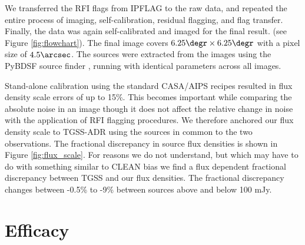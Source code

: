 \documentclass[twocolumn]{aastex61}
\begin{document}
{We transferred the RFI flags from IPFLAG to the raw data, and repeated
the entire process of imaging, self-calibration, residual flagging, and flag
transfer. Finally, the data was again self-calibrated and imaged for the final
result.  (see Figure \ref{fig:flowchart}). The final image covers $6.25\degr
\times 6.25 \degr$ with a pixel size of $4.5\arcsec$. The sources were extracted
from the images  using the PyBDSF source finder \citep{mohan_pybdsf_2015},
running with identical parameters across all images.

Stand-alone calibration using the standard CASA/AIPS recipes resulted in
flux density scale errors of up to 15\%. This becomes important while comparing
the absolute noise in an image though it does not affect the relative change in
noise with the application of RFI flagging procedures. We therefore anchored our
flux density scale to TGSS-ADR \citep{intema2017gmrt} using the sources in
common to the two observations. The fractional discrepancy in source flux
densities is shown in Figure \ref{fig:flux_scale}. For reasons we do not
understand, but which may have to do with something similar to CLEAN bias
\citep{condon1998nrao, cohen2007vla} we find a flux dependent fractional
discrepancy between TGSS and our flux densities. The fractional discrepancy
changes between  -0.5\% to -9\% between sources above and below 100 mJy.


\begin{figure*}
   \caption{The plots show the fractional flux density discrepancy between our
   data and TGSS-ADR for point sources common to both. The solid line shows the
   mean fractional discrepancy (corrected to zero by suitable scaling) and the
   dashed lines indicate the standard deviation of the scatter for sources above
   and below 100 mJy.}
   \label{fig:flux_scale}
\end{figure*}


\section{Efficacy}

}
\end{document}
